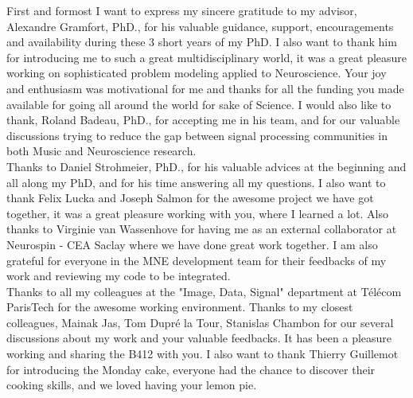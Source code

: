 
\begin{acknowledgements}
\addchaptertocentry{\acknowledgementname} %

\vspace{-5pt}
First and formost I want to express my sincere gratitude to my advisor, Alexandre Gramfort, PhD., for his valuable guidance, support, encouragements and availability during these 3 short years of my PhD. I also want to thank him for introducing me to such a great multidisciplinary world, it was a great pleasure working on sophisticated problem modeling applied to Neuroscience. Your joy and enthusiasm was motivational for me and thanks for all the funding you made available for going all around the world for sake of Science. I would also like to thank, Roland Badeau, PhD., for accepting me in his team, and for our valuable discussions trying to reduce the gap between signal processing communities in both Music and Neuroscience research.\\

\vspace{-10pt}
Thanks to Daniel Strohmeier, PhD., for his valuable advices at the beginning and all along my PhD, and for his time answering all my questions. I also want to thank Felix Lucka and Joseph Salmon for the awesome project we have got together, it was a great pleasure working with you, where I learned a lot. Also thanks to Virginie van Wassenhove for having me as an external collaborator at Neurospin - CEA Saclay where we have done great work together. I am also grateful for everyone in the MNE development team for their feedbacks of my work and reviewing my code to be integrated.
\\

\vspace{-10pt}
Thanks to all my colleagues at the "Image, Data, Signal" department at Télécom ParisTech for the awesome working environment. Thanks to my closest colleagues, Mainak Jas, Tom Dupré la Tour, Stanislas Chambon for our several discussions about my work and your valuable feedbacks. It has been a pleasure working and sharing the B412 with you. I also want to thank Thierry Guillemot for introducing the Monday cake, everyone had the chance to discover their cooking skills, and we loved having your lemon pie.\\


\end{acknowledgements}
